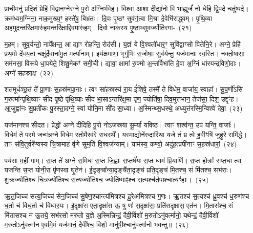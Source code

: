 {\anuvakamend[{दी॒या॒ दा॒यो ज॑यन्त्व॒मित्रा॒न्प्र च॑त्वारि॒ꣳ॒शच्च॑}]}

प्राची॒मनु॑ प्र॒दिशं॒ प्रेहि॑ वि॒द्वान॒ग्नेर॑ग्ने पु॒रो अ॑ग्निर्भवे॒ह। विश्वा॒ आशा॒ दीद्या॑नो॒ वि भा॒ह्यूर्जं॑ नो धेहि द्वि॒पदे॒ चतु॑ष्पदे। क्रम॑ध्वम॒ग्निना॒ नाक॒मुख्य॒ꣳ॒ हस्ते॑षु॒ बिभ्र॑तः। दि॒वः पृ॒ष्ठꣳ सुव॑र्ग॒त्वा मि॒श्रा दे॒वेभि॑राद्ध्वम्। पृ॒थि॒व्या अ॒हमुद॒न्तरि॑क्ष॒मारु॑हम॒न्तरि॑क्षा॒द्दिव॒मारु॑हम्। दि॒वो नाक॑स्य पृ॒ष्ठाथ्सुव॒र्ज्योति॑रगा-~(२१)\ip

म॒हम्। सुव॒र्यन्तो॒ नापे᳚क्षन्त॒ आ द्याꣳ रो॑हन्ति॒ रोद॑सी। य॒ज्ञं ये वि॒श्वतो॑धार॒ꣳ॒ सुवि॑द्वाꣳसो वितेनि॒रे। अग्ने॒ प्रेहि॑ प्रथ॒मो दे॑वय॒तां चक्षु॑र्दे॒वाना॑\-मु॒त मर्त्या॑नाम्। इय॑क्षमाणा॒ भृगु॑भिः स॒जोषाः॒ सुव॑र्यन्तु॒ यज॑मानाः स्व॒स्ति। नक्तो॒षासा॒ सम॑नसा॒ विरू॑पे धा॒पये॑ते॒ शिशु॒मेकꣳ॑ समी॒ची। द्यावा॒ क्षामा॑ रु॒क्मो अ॒न्तर्विभा॑ति दे॒वा अ॒ग्निं धा॑रयन्द्रविणो॒दाः। अग्ने॑ सहस्राक्ष~(२२)\ip

शतमूर्धञ्छ॒तं ते᳚ प्रा॒णाः स॒हस्र॑मपा॒नाः। त्वꣳ सा॑ह॒स्रस्य॑ रा॒य ई॑शिषे॒ तस्मै॑ ते विधेम॒ वाजा॑य॒ स्वाहा᳚। सु॒प॒र्णो॑\-ऽसि ग॒रुत्मा᳚न्पृथि॒व्याꣳ सी॑द पृ॒ष्ठे पृ॑थि॒व्याः सी॑द भा॒सा\-ऽ\-न्तरि॑क्ष॒मा पृ॑ण॒ ज्योति॑षा॒ दिव॒मुत्त॑भान॒ तेज॑सा॒ दिश॒ उद्दृꣳ॑ह। आ॒जुह्वा॑नः सु॒प्रती॑कः पु॒रस्ता॒दग्ने॒ स्वां योनि॒मा सी॑द सा॒ध्या। अ॒स्मिन्थ्स॒धस्थे॒ अध्युत्त॑रस्मि॒न्विश्वे॑ देवा॒~(२३)\ip

यज॑मानश्च सीदत। प्रेद्धो॑ अग्ने दीदिहि पु॒रो नो\-ऽज॑स्रया सू॒र्म्या॑ यविष्ठ। त्वाꣳ शश्व॑न्त॒ उप॑ यन्ति॒ वाजाः᳚। वि॒धेम॑ ते पर॒मे जन्म॑न्नग्ने वि॒धेम॒ स्तोमै॒रव॑रे स॒धस्थे᳚। यस्मा॒द्योने॑रु॒दारि॑था॒ यजे॒ तं प्र त्वे ह॒वीꣳषि॑ जुहुरे॒ समि॑द्धे। ताꣳ स॑वि॒तुर्वरे᳚ण्यस्य चि॒त्रामाहं वृ॑णे सुम॒तिं वि॒श्वज॑न्याम्। याम॑स्य॒ कण्वो॒ अदु॑ह॒त्प्रपी॑नाꣳ स॒हस्र॑धारां॒~(२४)\ip

पय॑सा म॒हीं गाम्। स॒प्त ते॑ अग्ने स॒मिधः॑ स॒प्त जि॒ह्वाः स॒प्तर्\mbox{}ष॑यः स॒प्त धाम॑ प्रि॒याणि॑। स॒प्त होत्राः᳚ सप्त॒धा त्वा॑ यजन्ति स॒प्त योनी॒रा पृ॑णस्वा घृ॒तेन॑। ई॒दृङ्चा᳚न्या॒दृङ्चै॑ता॒दृङ्च॑ प्रति॒दृङ्च॑ मि॒तश्च॒ सं मि॑तश्च॒ सभ॑राः। शु॒क्रज्यो॑तिश्च चि॒त्रज्यो॑तिश्च स॒त्यज्यो॑तिश्च॒ ज्योति॑ष्माꣴश्च स॒त्यश्च॑र्त॒पाश्चात्यꣳ॑हाः।~(२५)\ip

ऋ॒त॒जिच्च॑ सत्य॒जिच्च॑ सेन॒जिच्च॑ सु॒षेण॒श्चान्त्य॑मित्रश्च दू॒रेअ॑मित्रश्च ग॒णः। ऋ॒तश्च॑ स॒त्यश्च॑ ध्रु॒वश्च॑ ध॒रुण॑श्च ध॒र्ता च॑ विध॒र्ता च॑ विधार॒यः। ई॒दृक्षा॑स एता॒दृक्षा॑स ऊ॒ षु णः॑ स॒दृक्षा॑सः॒ प्रति॑सदृक्षास॒ एत॑न। मि॒तास॑श्च॒ सं मि॑तासश्च न ऊ॒तये॒ सभ॑रसो मरुतो य॒ज्ञे अ॒स्मिन्निन्द्रं॒ दैवी॒र्विशो॑ म॒रुतो\-ऽनु॑वर्त्मानो॒ यथेन्द्रं॒ दैवी॒र्विशो॑ म॒रुतो\-ऽनु॑वर्त्मान ए॒वमि॒मं यज॑मानं॒ दैवी᳚श्च॒ विशो॒ मानु॑षी॒श्चानु॑वर्त्मानो भवन्तु॥~(२६)\ip

